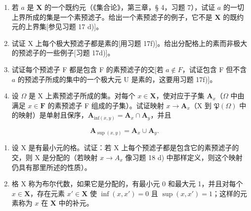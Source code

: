 \begin{enumerate}
\def\labelenumi{\alph{enumi})}
\item
  若 \(a\) 是 \(\mathbf{X}\) 的一个既约元（《集合论》，第三章，§ 4，习题 7），试证 \(a\) 的一切上界所成的集是一个素预滤子。给出一个素预滤子的例子，它不是 \(\mathbf{X}\) 的既约元的上界集{[}参见习题 17 d){]}。
\item
  试证 X 上每个极大预滤子都是素的{[}用习题 17f){]}。给出分配格上的素而非极大的预滤子的一些例子{[}习题 17d){]}。
\item
  试证每个预滤子 F 都是包含 F 的素预滤子的交{[}若 \(a \notin F\)，试证包含 F 但不含 \(a\) 的预滤子所成的集中的一个极大元 U 是素的，这要用习题 17f){]}。
\item
  设 \(\Omega\) 是 X 上素预滤子所成的集。对每个 \(x \in \mathbf{X}\)，使对应于子集 \(\mathbf{A}_x\)（\(\Omega\) 中由满足 \(x \in \mathbf{F}\) 的素预滤子 F 组成的子集）。试证映射 \(x \to \mathbf{A}_x\)（X 到 \(\mathfrak{P}(\Omega)\) 中的映射）是单射且保序，\(\mathbf{A}_{\mathrm{inf}(x,y)} = \mathbf{A}_x \cap \mathbf{A}_y\)，并且
\end{enumerate}

\[
\mathbf {A} _ {\sup (x, y)} = \mathbf {A} _ {x} \cup \mathbf {A} _ {y}.
\]

\begin{enumerate}
\def\labelenumi{\arabic{enumi})}
\setcounter{enumi}{18}
\item
  设 X 是有最小元的格。试证：若 X 上每个预滤子都是包含它的素预滤子的交，则 X 是分配的（若映射 \(x \rightarrow A_{x}\) 像习题 18 d) 中那样定义，则这个映射仍具有那里所述的性质）。
\item
  格 X 称为布尔代数，如果它是分配的，有最小元 0 和最大元 1，并且对每个 \(x \in \mathbf{X}\)，存在元素 \(x' \in \mathbf{X}\) 使 \(\inf (x, x') = 0\) 且 \(\sup (x, x') = 1\)；这样的元素称为 \(x\) 在 \(\mathbf{X}\) 中的补元。
\end{enumerate}

